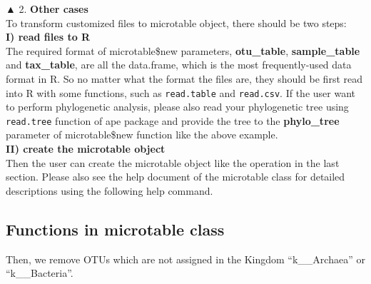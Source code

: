 \documentclass[
]{book}
\newenvironment{Shaded}{\begin{snugshade}}{\end{snugshade}}
\newcommand{\CommentTok}[1]{\textcolor[rgb]{0.56,0.35,0.01}{\textit{#1}}}
\newcommand{\FunctionTok}[1]{\textcolor[rgb]{0.00,0.00,0.00}{#1}}
\newcommand{\NormalTok}[1]{#1}
\newcommand{\SpecialCharTok}[1]{\textcolor[rgb]{0.00,0.00,0.00}{#1}}
\newcommand{\StringTok}[1]{\textcolor[rgb]{0.31,0.60,0.02}{#1}}
\begin{document}
▲ 2. \textbf{Other cases}\\
To transform customized files to microtable object,
there should be two steps:\\
\textbf{I) read files to R}\\
The required format of microtable\$new parameters, \textbf{otu\_table}, \textbf{sample\_table} and \textbf{tax\_table}, are all the data.frame, which is the most frequently-used data format in R.
So no matter what the format the files are, they should be first read into R with some functions, such as \texttt{read.table} and \texttt{read.csv}.
If the user want to perform phylogenetic analysis, please also read your phylogenetic tree using \texttt{read.tree} function of ape package and
provide the tree to the \textbf{phylo\_tree} parameter of microtable\$new function like the above example.\\
\textbf{II) create the microtable object}\\
Then the user can create the microtable object like the operation in the last section.
Please also see the help document of the microtable class for detailed descriptions using the following help command.

\begin{Shaded}
\end{Shaded}

\hypertarget{functions-in-microtable-class}{%
\subsection{Functions in microtable class}\label{functions-in-microtable-class}}

Then, we remove OTUs which are not assigned in the Kingdom ``k\_\_Archaea'' or ``k\_\_Bacteria''.

\begin{Shaded}
\end{Shaded}
\end{document}
